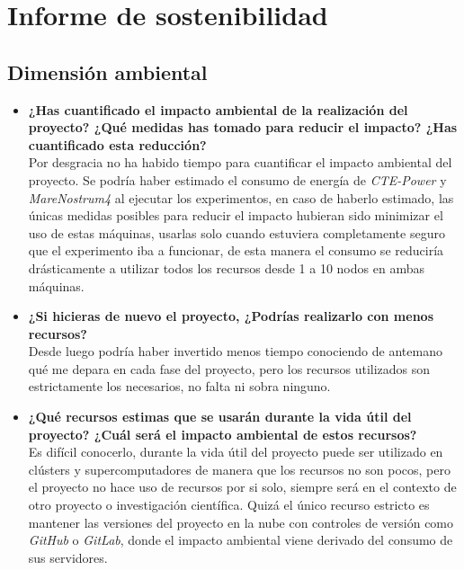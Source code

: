 \chapter{Informe de sostenibilidad}

\section{Dimensión ambiental}

\begin{itemize}
	\item \textbf{¿Has cuantificado el impacto ambiental de la realización del proyecto? ¿Qué medidas has
		tomado para reducir el impacto? ¿Has cuantificado esta reducción?} \\
	
	Por desgracia no ha habido tiempo para cuantificar el impacto ambiental del proyecto. Se podría haber estimado el consumo de energía de \textit{CTE-Power} y \textit{MareNostrum4} al ejecutar los experimentos, en caso de haberlo estimado, las únicas medidas posibles para reducir el impacto hubieran sido minimizar el uso de estas máquinas, usarlas solo cuando estuviera completamente seguro que el experimento iba a funcionar, de esta manera el consumo se reduciría drásticamente a utilizar todos los recursos desde 1 a 10 nodos en ambas máquinas. 
	
	\item \textbf{¿Si hicieras de nuevo el proyecto, ¿Podrías realizarlo con menos recursos?} \\
	
	Desde luego podría haber invertido menos tiempo conociendo de antemano qué me depara en cada fase del proyecto, pero los recursos utilizados son estrictamente los necesarios, no falta ni sobra ninguno.
	
	\item \textbf{¿Qué recursos estimas que se usarán durante la vida útil del proyecto? ¿Cuál será el
		impacto ambiental de estos recursos?} \\
	
	Es difícil conocerlo, durante la vida útil del proyecto puede ser utilizado en clústers y supercomputadores de manera que los recursos no son pocos, pero el proyecto no hace uso de recursos por si solo, siempre será en el contexto de otro proyecto o investigación científica. Quizá el único recurso estricto es mantener las versiones del proyecto en la nube con controles de versión como \textit{GitHub} o \textit{GitLab}, donde el impacto ambiental viene derivado del consumo de sus servidores.
	

\end{itemize}
